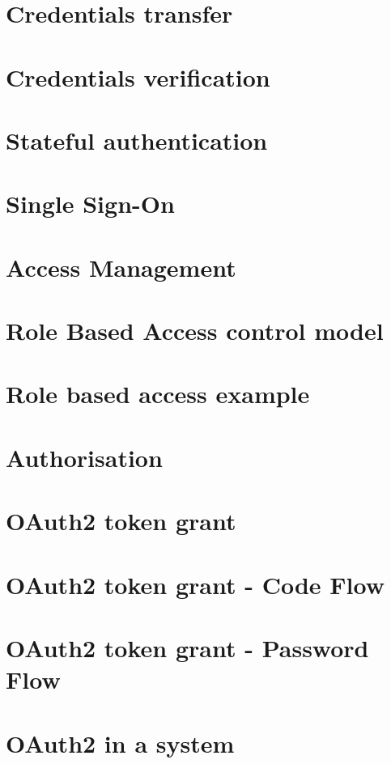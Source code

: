\documentclass[11pt]{article}
\begin{document}
\section{Credentials transfer}

\section{Credentials verification}

\section{Stateful authentication}

\section{Single Sign-On}

\section{Access Management}

\section{Role Based Access control model}

\section{Role based access example}

\section{Authorisation}

\section{OAuth2 token grant}

\section{OAuth2 token grant - Code Flow}

\section{OAuth2 token grant - Password Flow}

\section{OAuth2 in a system}
\end{document}
